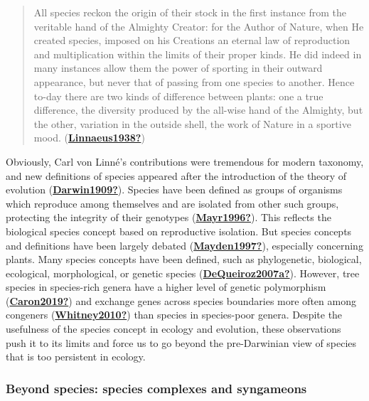 \documentclass[12pt,twoside,a4paper, a]{article}
\begin{document}
\begin{quote}
All species reckon the origin of their stock in the first instance from the veritable hand of the Almighty Creator: for the Author of Nature, when He created species, imposed on his Creations an eternal law of reproduction and multiplication within the limits of their proper kinds. He did indeed in many instances allow them the power of sporting in their outward appearance, but never that of passing from one species to another. Hence to-day there are two kinds of difference between plants: one a true difference, the diversity produced by the all-wise hand of the Almighty, but the other, variation in the outside shell, the work of Nature in a sportive mood. (\protect\hyperlink{ref-Linnaeus1938}{\textbf{Linnaeus1938?}})
\end{quote}

Obviously, Carl von Linné's contributions were tremendous for modern taxonomy,
and new definitions of species appeared after the introduction of the theory of evolution (\protect\hyperlink{ref-Darwin1909}{\textbf{Darwin1909?}}).
Species have been defined as groups of organisms which reproduce among themselves and are isolated from other such groups,
protecting the integrity of their genotypes (\protect\hyperlink{ref-Mayr1996}{\textbf{Mayr1996?}}).
This reflects the biological species concept based on reproductive isolation.
But species concepts and definitions have been largely debated (\protect\hyperlink{ref-Mayden1997}{\textbf{Mayden1997?}}), especially concerning plants.
Many species concepts have been defined, such as phylogenetic, biological, ecological, morphological, or genetic species (\protect\hyperlink{ref-DeQueiroz2007a}{\textbf{DeQueiroz2007a?}}).
However, tree species in species-rich genera have a higher level of genetic polymorphism (\protect\hyperlink{ref-Caron2019}{\textbf{Caron2019?}}) and exchange genes across species boundaries more often among congeners (\protect\hyperlink{ref-Whitney2010}{\textbf{Whitney2010?}}) than species in species-poor genera.
Despite the usefulness of the species concept in ecology and evolution,
these observations push it to its limits and force us to go beyond the pre-Darwinian view of species that is too persistent in ecology.

\hypertarget{beyond-species-species-complexes-and-syngameons}{%
\subsubsection{Beyond species: species complexes and syngameons}\label{beyond-species-species-complexes-and-syngameons}}
\end{document}
